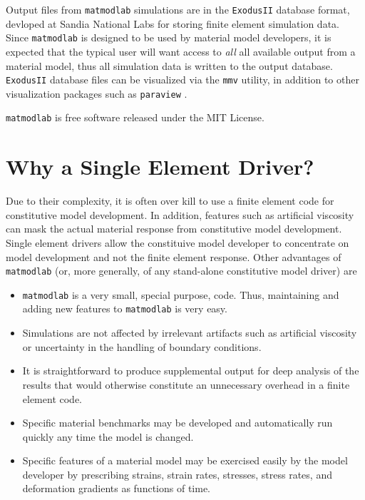 \documentclass[12pt,report,strict]{SANDreport/SANDreport}
\newcommand{\mml}{\texttt{matmodlab}}
\newcommand{\mmv}{\texttt{mmv}}
\newcommand{\exodusii}{{\sc\texttt{ExodusII}}}
\newcommand{\paraview}[1]{{\sc\texttt{paraview}}}
\begin{document}
Output files from \mml{} simulations are in the \exodusii{} \cite{exodus}
database format, devloped at Sandia National Labs for storing finite element
simulation data. Since \mml{} is designed to be used by material model
developers, it is expected that the typical user will want access to
\emph{all} all available output from a material model, thus all simulation
data is written to the output database. \exodusii{} database files can be
visualized via the \mmv{} utility, in addition to other visualization packages
such as \paraview{} \cite{paraview}.

\mml{} is free software released under the MIT License.

\section{Why a Single Element Driver?}
\label{sec:why}
Due to their complexity, it is often over kill to use a finite element code
for constitutive model development. In addition, features such as artificial
viscosity can mask the actual material response from constitutive model
development. Single element drivers allow the constituive model developer to
concentrate on model development and not the finite element response. Other
advantages of \mml{} (or, more generally, of any stand-alone
constitutive model driver) are

\begin{itemize}
  \item \mml{} is a very small, special purpose, code. Thus, maintaining and
  adding new features to \mml{} is very easy.

  \item Simulations are not affected by irrelevant artifacts such as
  artificial viscosity or uncertainty in the handling of boundary conditions.

  \item It is straightforward to produce supplemental output for deep analysis
  of the results that would otherwise constitute an unnecessary overhead in a
  finite element code.

  \item Specific material benchmarks may be developed and automatically run
  quickly any time the model is changed.

  \item Specific features of a material model may be exercised easily by the
  model developer by prescribing strains, strain rates, stresses, stress
  rates, and deformation gradients as functions of time.
\end{itemize}
\end{document}
